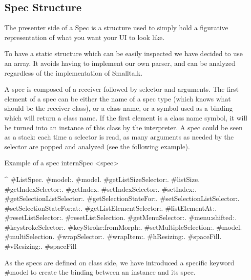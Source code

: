 \documentclass[a4paper,10pt,twoside]{book}
\begin{document}
\subsection{Spec Structure}\label{spec_structure}

The presenter side of a Spec is a structure used to simply hold a figurative representation of what you want your UI to look like. 

To have a static structure which can be easily inspected we have decided to use an array. It avoids having to implement our own parser, and can be analyzed regardless of the implementation of Smalltalk.

A spec is composed of a receiver followed by selector and arguments.
The first element of a spec can be either the name of a spec type (which knows what should be the receiver class), or a class name, or a symbol used as a binding which will return a class name. If the first element is a class name symbol, it will be turned into an instance of this class by the interpreter. A spec could be seen as a stack: each time a selector is read, as many arguments as needed by the selector are popped and analyzed (see the following example).

\begin{method}{Example of a spec}
internSpec
	<spec>
	
	^ {#ListSpec.	
               #model:.                                        #model.
               #getListSizeSelector:.                   #listSize.
               #getIndexSelector:.                       #getIndex.
               #setIndexSelector:.                       #setIndex:.
               #getSelectionListSelector:.	         #getSelectionStateFor:.
               #setSelectionListSelector:.	         #setSelectionStateFor:at:.
               #getListElementSelector:. 	        #listElementAt:.
               #resetListSelector:.                       #resetListSelection.
               #getMenuSelector:.	                   #menu:shifted:.
               #keystrokeSelector:.                     #keyStroke:fromMorph:.
               #setMultipleSelection:.	               {#model. #multiSelection}.
               #wrapSelector:.                            #wrapItem:.
               #hResizing:.                                 #spaceFill.
               #vResizing:.                                 #spaceFill}
\end{method} 

As the specs are defined on class side, we have introduced a specific keyword \#model to create the binding between an instance and its spec.
\end{document}
